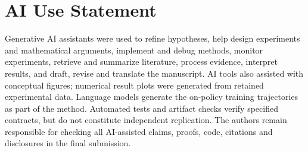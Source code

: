 \section*{AI Use Statement}
Generative AI assistants were used to refine hypotheses, help design experiments and mathematical arguments, implement and debug methods, monitor experiments, retrieve and summarize literature, process evidence, interpret results, and draft, revise and translate the manuscript. AI tools also assisted with conceptual figures; numerical result plots were generated from retained experimental data. Language models generate the on-policy training trajectories as part of the method. Automated tests and artifact checks verify specified contracts, but do not constitute independent replication. The authors remain responsible for checking all AI-assisted claims, proofs, code, citations and disclosures in the final submission.

